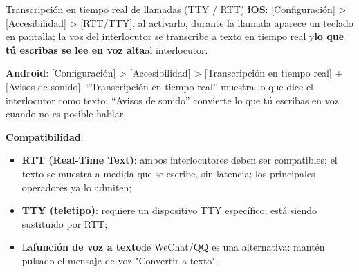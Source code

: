 \begin{tcbinfo}{Transcripción en tiempo real de llamadas (TTY / RTT)}
\textbf{iOS}: [Configuración] > [Accesibilidad] > [RTT/TTY], al activarlo, durante la llamada aparece un teclado en pantalla; la voz del interlocutor se transcribe a texto en tiempo real y\textbf{lo que tú escribas se lee en voz alta}al interlocutor.

\textbf{Android}: [Configuración] > [Accesibilidad] > [Transcripción en tiempo real] + [Avisos de sonido]. “Transcripción en tiempo real” muestra lo que dice el interlocutor como texto; “Avisos de sonido” convierte lo que tú escribas en voz cuando no es posible hablar.

\textbf{Compatibilidad}:

\begin{itemize}
  \item \textbf{RTT (Real-Time Text)}: ambos interlocutores deben ser compatibles; el texto se muestra a medida que se escribe, sin latencia; los principales operadores ya lo admiten;
  \item \textbf{TTY (teletipo)}: requiere un dispositivo TTY específico; está siendo sustituido por RTT;
  \item La\textbf{función de voz a texto}de WeChat/QQ es una alternativa: mantén pulsado el mensaje de voz "Convertir a texto".
\end{itemize}

\end{tcbinfo}


